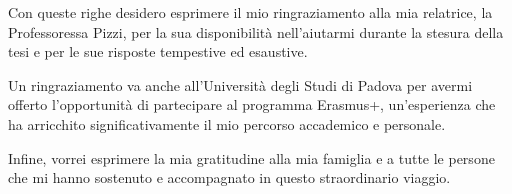 
Con queste righe desidero esprimere il mio ringraziamento alla mia relatrice, la Professoressa Pizzi, per la sua disponibilità nell'aiutarmi durante la stesura della tesi e per le sue risposte tempestive ed esaustive.

\vspace{5px}

Un ringraziamento va anche all'Università degli Studi di Padova per avermi offerto l'opportunità di partecipare al programma Erasmus+, un'esperienza che ha arricchito significativamente il mio percorso accademico e personale.

\vspace{5px}

Infine, vorrei esprimere la mia gratitudine alla mia famiglia e a tutte le persone che mi hanno sostenuto e accompagnato in questo straordinario viaggio.

